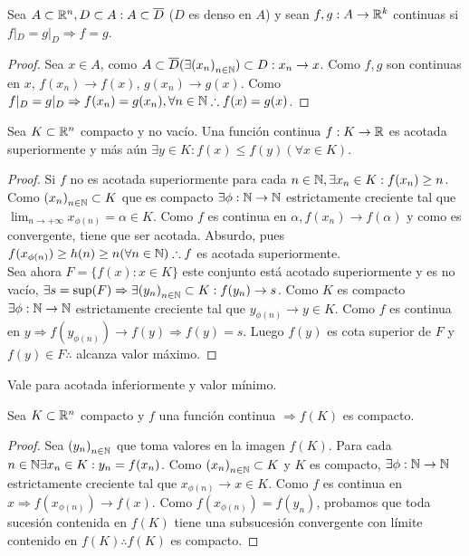 \begin{prop}
  Sea \(A \subset \mathbb{R}^n, D \subset A : A \subset \overline{D} \) (\(D\) es denso en \(A\)) y sean \(f, g : A \to \mathbb{R}^k\) continuas si \(f|_D = g|_D \Rightarrow f=g\).

  \begin{proof}
    Sea \(x \in A\), como \(A \subset \overline{D} (\exists {(x_n)}_{n \in \mathbb{N}}) \subset D : x_n \to x\). Como \(f, g\) son continuas en \(x\), \(f(x_n) \to f(x)\), \(g(x_n) \to g(x)\). Como \(f|_D = g|_D \Rightarrow f(x_n) = g(x_n), \forall n \in \mathbb{N} \therefore f(x) = g(x)\).
  \end{proof}
\end{prop}

\clearpage

\begin{theorem}[Weiertrass]
  Sea \(K \subset \mathbb{R}^n\) compacto y no vacío. Una función continua \(f: K \to \mathbb{R} \) es acotada superiormente y más aún \(\exists y \in K : f(x) \leq f(y) (\forall x \in K)\).
  \begin{proof}
    Si \(f\) no es acotada superiormente para cada \(n \in \mathbb{N}, \exists x_n \in K : f(x_n) \geq n\). Como \({(x_n)}_{n \in \mathbb{N}} \subset K\) que es compacto \(\exists \phi: \mathbb{N} \to \mathbb{N} \) estrictamente creciente tal que \(\lim_{n \to +\infty} x_{\phi(n)} = \alpha \in K\). Como \(f\) es continua en \(\alpha, f(x_n) \to f(\alpha)\) y como es convergente, tiene que ser acotada. Absurdo, pues \(f(x_{\phi(n)}) \geq h(n) \geq n (\forall n \in \mathbb{N}) \therefore f\) es acotada superiormente. \\
    Sea ahora \(F = \{ f(x) : x \in K\} \) este conjunto está acotado superiormente y es no vacío, \(\exists s = \sup(F) \Rightarrow \exists {(y_n)}_{n \in \mathbb{N}} \subset K : f(y_n) \to s\). Como \(K\) es compacto \(\exists \phi : \mathbb{N} \to \mathbb{N} \) estrictamente creciente tal que \(y_{\phi(n)} \to y \in K\). Como \(f\) es continua en \(y \Rightarrow f(y_{\phi(n)}) \to f(y) \Rightarrow f(y) = s\). Luego \(f(y)\) es cota superior de \(F\) y \(f(y) \in F \therefore \) alcanza valor máximo.
  \end{proof}
\end{theorem}

\begin{note}
  Vale para acotada inferiormente y valor mínimo.
\end{note}

\begin{theorem}
  Sea \(K \subset \mathbb{R}^n\) compacto y \(f\) una función continua \(\Rightarrow f(K)\) es compacto.
  \begin{proof}
    Sea \({(y_n)}_{n \in \mathbb{N}} \) que toma valores en la imagen \(f(K)\). Para cada \(n \in \mathbb{N} \exists x_n \in K : y_n = f(x_n)\). Como \({(x_n)}_{n \in \mathbb{N}} \subset K\) y \(K\) es compacto, \(\exists \phi : \mathbb{N} \to \mathbb{N} \) estrictamente creciente tal que \(x_{\phi(n)} \to x \in K\). Como \(f\) es continua en \(x \Rightarrow f(x_{\phi(n)}) \to f(x)\). Como \(f(x_{\phi(n)}) = f(y_n)\), probamos que toda sucesión contenida en \(f(K)\) tiene una subsucesión convergente con límite contenido en \(f(K) \therefore f(K)\) es compacto.
  \end{proof}
\end{theorem}

